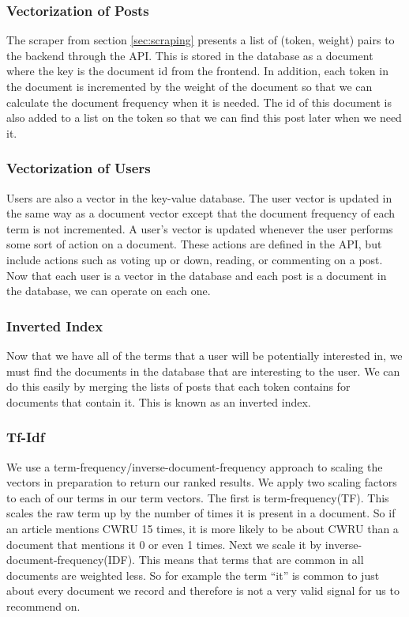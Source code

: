 \documentclass[11pt,letterpaper,titlepage]{article}
\begin{document}
\subsubsection{Vectorization of Posts}
The scraper from section \ref{sec:scraping} presents a list of (token, weight)
pairs to the backend through the API.  This is stored in the database as a
document where the key is the document id from the frontend.  In addition, each
token in the document is incremented by the weight of the document so that we
can calculate the document frequency when it is needed. The id of this document
is also added to a list on the token so that we can find this post later when we
need it.
\subsubsection{Vectorization of Users}
Users are also a vector in the key-value database.  The user vector is updated
in the same way as a document vector except that the document frequency of each
term is not incremented.  A user's vector is updated whenever the user performs
some sort of action on a document.  These actions are defined in the API, but
include actions such as voting up or down, reading, or commenting on a post.
Now that each user is a vector in the database and each post is a document in
the database, we can operate on each one.
\subsubsection{Inverted Index}
Now that we have all of the terms that a user will be potentially interested in,
we must find the documents in the database that are interesting to the user.  We
can do this easily by merging the lists of posts that each token contains for
documents that contain it. This is known as an inverted index.
\subsubsection{Tf-Idf}
We use a term-frequency/inverse-document-frequency approach to scaling the
vectors in preparation to return our ranked results. We apply two scaling
factors to each of our terms in our term vectors. The first is
term-frequency(TF).  This scales the raw term up by the number of times it is
present in a document.  So if an article mentions CWRU 15 times, it is more
likely to be about CWRU than a document that mentions it 0 or even 1 times.
Next we scale it by inverse-document-frequency(IDF).  This means that terms that
are common in all documents are weighted less. So for example the term ``it'' is
common to just about every document we record and therefore is not a very valid
signal for us to recommend on.
\end{document}
